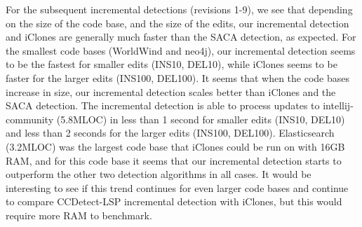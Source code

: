 For the subsequent incremental detections (revisions 1-9), we see that depending on the
size of the code base, and the size of the edits, our incremental detection and iClones
are generally much faster than the SACA detection, as expected. For the smallest code
bases (WorldWind and neo4j), our incremental detection seems to be the fastest for smaller
edits (INS10, DEL10), while iClones seems to be faster for the larger edits (INS100,
DEL100). It seems that when the code bases increase in size, our incremental detection
scales better than iClones and the SACA detection. The incremental detection is able to
process updates to intellij-community (5.8MLOC) in less than 1 second for smaller edits
(INS10, DEL10) and less than 2 seconds for the larger edits (INS100, DEL100).
Elasticsearch (3.2MLOC) was the largest code base that iClones could be run on with 16GB
RAM, and for this code base it seems that our incremental detection starts to outperform
the other two detection algorithms in all cases. It would be interesting to see if this
trend continues for even larger code bases and continue to compare CCDetect-LSP
incremental detection with iClones, but this would require more RAM to benchmark.

